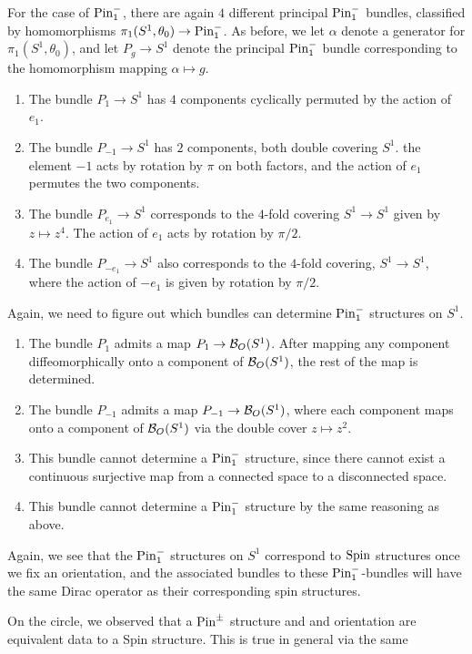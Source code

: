 \begin{exmp}
For the case of $\mathrm{Pin}_1^-$, there are again $4$ different principal $\mathrm{Pin}_1^-$
bundles, classified by homomorphisms $\pi_1(S^1, \theta_0) \to \mathrm{Pin}_1^-$.
As before, we let $\alpha$ denote a generator for $\pi_1(S^1, \theta_0)$, and
let $P_g \to S^1$ denote the principal $\mathrm{Pin}_1^-$ bundle corresponding to
the homomorphism mapping $\alpha \mapsto g$.
%
\begin{enumerate}
  \item The bundle $P_1 \to S^1$ has $4$ components cyclically permuted
  by the action of $e_1$.
  \item The bundle $P_{-1} \to S^1$ has $2$ components, both double covering $S^1$.
  the element $-1$ acts by rotation by $\pi$ on both factors, and the action
  of $e_1$ permutes the two components.
  \item The bundle $P_{e_1} \to S^1$ corresponds to the $4$-fold covering
  $S^1 \to S^1$ given by $z \mapsto z^4$. The action of $e_1$ acts by
  rotation by $\pi / 2$.
  \item The bundle $P_{-e_1} \to S^1$ also corresponds to the $4$-fold covering,
  $S^1 \to S^1$, where the action of $-e_1$ is given by rotation by $\pi / 2$.
\end{enumerate}
%
Again, we need to figure out which bundles can determine $\mathrm{Pin}_1^-$ structures
on $S^1$.
%
\begin{enumerate}
  \item The bundle $P_1$ admits a map $P_1 \to \mathcal{B}_O(S^1)$. After mapping any
  component diffeomorphically onto a component of $\mathcal{B}_O(S^1)$, the rest of the
  map is determined.
  \item The bundle $P_{-1}$ admits a map $P_{-1} \to \mathcal{B}_O(S^1)$, where
  each component maps onto a component of $\mathcal{B}_O(S^1)$ via the double cover
  $z \mapsto z^2$.
  \item This bundle cannot determine a $\mathrm{Pin}_1^-$ structure, since there
  cannot exist a continuous surjective map from a connected space to a
  disconnected space.
  \item This bundle cannot determine a $\mathrm{Pin}_1^-$ structure by the same
  reasoning as above.
\end{enumerate}
Again, we see that the $\mathrm{Pin}_1^-$ structures on $S^1$ correspond to $\mathrm{Spin}$
structures once we fix an orientation, and the associated bundles to these
$\mathrm{Pin}_1^-$-bundles will have the same Dirac operator as their corresponding
spin structures.
\end{exmp}
%
On the circle, we observed that a $\mathrm{Pin}^\pm$ structure and and orientation
are equivalent data to a Spin structure. This is true in general via the same
